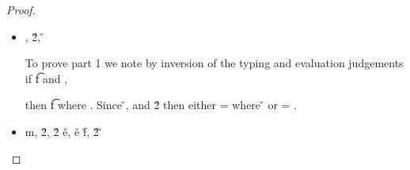 \begin{lemma}
\begin{enumerate}
\begin{proof}
\begin{case}[T-App]
\begin{itemize}
  \item[]
\begin{subcase}[B-BetaClosure]
  \opsem {\openv{}}
         {}
         { {\abs {\x{}} {\s{}} {}}},
  \opsem {\openv{}}
         {}
         {\v{2}},
         {}
         {\v{}}

         To prove part 1 we note by inversion of the typing and evaluation
         judgements if
  \judgement {\propenv{}} { {\ArrowOne {\x{}} {\s{}}
                                                       {\t{f}}
                                                       {
                                                                   {}}
                                                       {}}}
                {
                            {}}
                {}
                and 
  \opsem {\openv{}}
         {}
         { {\abs {\x{}} {\s{}} {}}},

         then
{ 
            { {\t{f}}}
             {
                         {}}
             {}}
         where .
         Since 
         {}
         {\v{}},
  \judgement {\propenv{}}
                 { {\s{}}}
                 {
                             {}}
                 {} 
         and
  \opsem {\openv{}}
         {}
         {\v{2}}
         then either 
                              \object{} = {
                                                {}
                                                {\x{}}}
                                                where
         \inopenv {\openv{}} {
                              {}
                              {\x{}}} {\v{}}
                              or \object{} = \emptyobject{}.

\end{subcase}
  \item[]
\begin{subcase}[B-BetaMulti]
  \opsem {\openv{}}
         {}
         { {m}},
  \opsem {\openv{}}
         {}
         {\v{2}},
  \opsem {\openv{}}
         { {\v{2}}}
         {\v{e}},
  \getmethod {\disptable{}}
             {\v{e}}
             {\v{f}},
  \opsem {\openv{}}
         { {\v{2}}}
         {\v{}}


\end{subcase}
\end{itemize}
\end{case}
\end{proof}
\end{enumerate}
\end{lemma}
